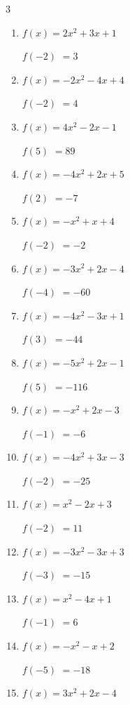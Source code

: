 \begin{multicols}{3}
\begin{enumerate}
$f(4)$
        $= -27$

\columnbreak %

\resetques

  \item $f(x)=2x^{2}+3x+1$

$f(-2)$
        $= 3$

  \item $f(x)=-2x^{2}-4x+4$

$f(-2)$
        $= 4$

  \item $f(x)=4x^{2}-2x-1$

$f(5)$
        $= 89$

  \item $f(x)=-4x^{2}+2x+5$

$f(2)$
        $= -7$

  \item $f(x)=-x^{2}+x+4$

$f(-2)$
        $= -2$

  \item $f(x)=-3x^{2}+2x-4$

$f(-4)$
        $= -60$

  \item $f(x)=-4x^{2}-3x+1$

$f(3)$
        $= -44$

  \item $f(x)=-5x^{2}+2x-1$

$f(5)$
        $= -116$

  \item $f(x)=-x^{2}+2x-3$

$f(-1)$
        $= -6$

  \item $f(x)=-4x^{2}+3x-3$

$f(-2)$
        $= -25$

  \item $f(x)=x^{2}-2x+3$

$f(-2)$
        $= 11$

  \item $f(x)=-3x^{2}-3x+3$

$f(-3)$
        $= -15$

  \item $f(x)=x^{2}-4x+1$

$f(-1)$
        $= 6$

  \item $f(x)=-x^{2}-x+2$

$f(-5)$
        $= -18$

  \item $f(x)=3x^{2}+2x-4$


\end{enumerate}
\end{multicols}

